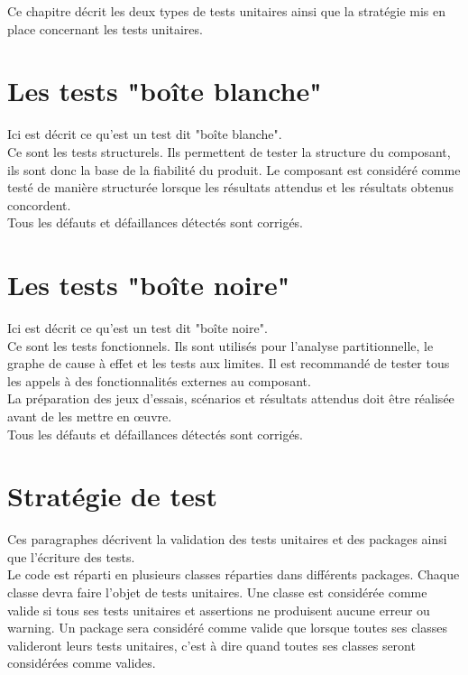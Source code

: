 
Ce chapitre décrit les deux types de tests unitaires ainsi que la stratégie mis en place concernant les tests unitaires.

\section{Les tests "boîte blanche"}
	Ici est décrit ce qu'est un test dit "boîte blanche". \\	
		
	Ce sont les tests structurels. Ils permettent de tester la structure du composant, ils sont donc la base de la fiabilité du produit. Le composant est considéré comme testé de manière structurée lorsque les résultats attendus et les résultats obtenus concordent. \\
	
	Tous les défauts et défaillances détectés sont corrigés.
	
\section{Les tests "boîte noire"}
	Ici est décrit ce qu'est un test dit "boîte noire". \\	
		
	Ce sont les tests fonctionnels. Ils sont utilisés pour l’analyse partitionnelle, le graphe de cause à effet et les tests aux limites. Il est recommandé de tester tous les appels à des fonctionnalités externes au composant. \\
	
	La préparation des jeux d’essais, scénarios et résultats attendus doit être réalisée avant de les mettre en œuvre. \\
	
	Tous les défauts et défaillances détectés sont corrigés.
	
	
\section{Stratégie de test}
	Ces paragraphes décrivent la validation des tests unitaires et des packages ainsi que l'écriture des tests. \\
		
	Le code est réparti en plusieurs classes réparties dans différents packages. Chaque classe devra faire l'objet de tests unitaires. Une classe est considérée comme valide si tous ses tests unitaires et assertions ne produisent aucune erreur ou warning. Un package sera considéré comme valide que lorsque toutes ses classes valideront leurs tests unitaires, c'est à dire quand toutes ses classes seront considérées comme valides. \\
	
